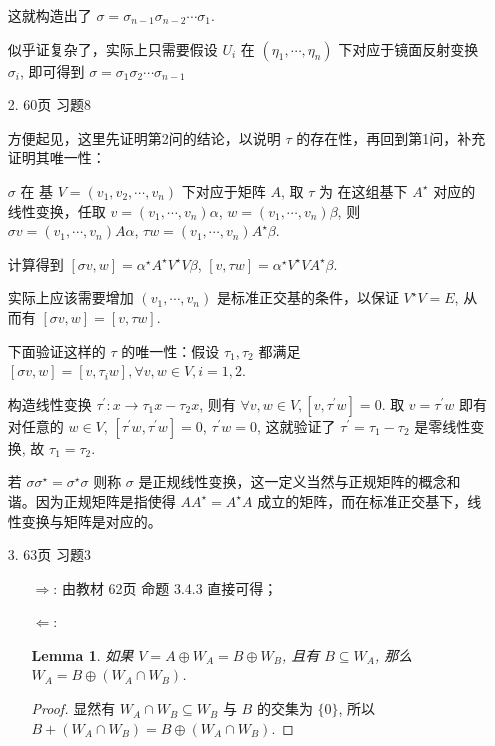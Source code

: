 \documentclass{article}
\newtheorem{lemma}[theorem]{Lemma}
\begin{document}
\begin{spacing}{1.5}
\begin{itemize}
    这就构造出了 $\sigma = \sigma_{n-1}\sigma_{n-2}\cdots \sigma_1$.

    似乎证复杂了，实际上只需要假设 $U_i$ 在 $(\eta_1, \cdots, \eta_n)$ 下对应于镜面反射变换 $\sigma_i$, 即可得到 $\sigma = \sigma_1\sigma_2\cdots \sigma_{n-1}$

    \item [2.] 60页 习题8

    方便起见，这里先证明第2问的结论，以说明 $\tau$ 的存在性，再回到第1问，补充证明其唯一性：

    $\sigma$ 在 基 $V=(v_1,v_2, \cdots, v_n)$ 下对应于矩阵 $A$, 取 $\tau$ 为 在这组基下 $A^\star$ 对应的线性变换，任取 $v = (v_1, \cdots, v_n)\alpha$, $w = (v_1,\cdots, v_n)\beta$, 则 $\sigma v = (v_1,\cdots, v_n)A\alpha$, $\tau w = (v_1,\cdots, v_n)A^\star\beta$. 
    
    计算得到 $[\sigma v, w] = \alpha^\star A^\star V^\star V \beta$, $[v, \tau w] = \alpha^\star V^\star VA^\star \beta$.
    
    实际上应该需要增加 $(v_1, \cdots, v_n)$ 是标准正交基的条件，以保证 $V^\star V = E$, 从而有 $[\sigma v, w] = [v, \tau w]$.

    下面验证这样的 $\tau$ 的唯一性：假设 $\tau_1, \tau_2$ 都满足 $[\sigma v, w] = [v, \tau_i w], \forall v, w\in V, i=1,2$. 
    
    构造线性变换 $\tau^\prime : x \to \tau_1 x - \tau_2 x$, 则有 $\forall  v, w\in V, [v, \tau^\prime w] = 0$. 取 $v=\tau^\prime w$ 即有 对任意的 $w\in V$, $[\tau^\prime w, \tau^\prime w] = 0$, $\tau^\prime w = 0$, 这就验证了 $\tau^\prime = \tau_1 - \tau_2$ 是零线性变换, 故 $\tau_1 = \tau_2$.

    若 $\sigma\sigma^\star = \sigma^\star\sigma$ 则称 $\sigma$ 是正规线性变换，这一定义当然与正规矩阵的概念和谐。因为正规矩阵是指使得 $AA^\star = A^\star A$ 成立的矩阵，而在标准正交基下，线性变换与矩阵是对应的。

    \item [3.] 63页 习题3 
    \begin{itemize}
        \item [$\Rightarrow$:] 由教材 62页 命题 3.4.3 直接可得；
        \item [$\Leftarrow$:]
        \begin{lemma}
            如果 $V = A\oplus W_A = B \oplus W_B$, 且有 $B\subseteq W_A$, 那么 $W_A = B\oplus (W_A \cap W_B)$.
        \end{lemma}
        \begin{proof}
            显然有 $W_A\cap W_B \subseteq W_B$ 与 $B$ 的交集为 $\{0\}$, 所以 $B + (W_A\cap W_B) = B\oplus (W_A \cap W_B)$.
            

\end{proof}
\end{itemize}
\end{itemize}
\end{spacing}
\end{document}
